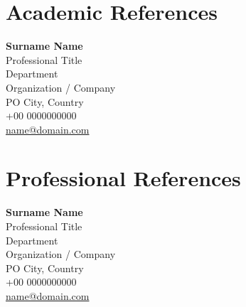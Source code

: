 \documentclass[11pt,a4paper,sans]{moderncv}        %
\begin{document}
\makecvtitle


\vspace{1cm}
\section{Academic References}
\begin{minipage}[t]{3in}
\textbf{Surname Name}\\
Professional Title\\
Department \\
Organization / Company\\
PO City, Country\\
\phonesymbol +00 0000000000\\ 
\emailsymbol \href{mailto:name@domain.com}{name@domain.com}
\end{minipage}

\vspace{1cm}
\section{Professional References}
\begin{minipage}[t]{3in}
\textbf{Surname Name}\\
Professional Title\\
Department \\
Organization / Company\\
PO City, Country\\
\phonesymbol +00 0000000000\\ 
\emailsymbol \href{mailto:name@domain.com}{name@domain.com}
\end{minipage}
\end{document}
